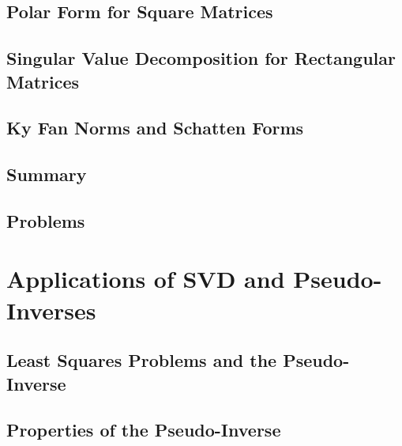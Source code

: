 \documentclass[a4paper]{article}
\begin{document}
\subsection{ Polar Form for Square Matrices} %

\subsection{ Singular Value Decomposition for Rectangular Matrices} %

\subsection{ Ky Fan Norms and Schatten Forms} %

\subsection{ Summary} %

\subsection{ Problems} %


\newpage
\section{Applications of SVD and Pseudo-Inverses}
\subsection{ Least Squares Problems and the Pseudo-Inverse} %

\subsection{ Properties of the Pseudo-Inverse} %
\end{document}
